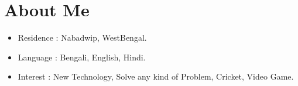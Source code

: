 \documentclass[letterpaper,11pt]{article}
\newcommand{\resumeItem}[1]{
  \item\small{
    {#1 \vspace{-2pt}}
  }
}
\newcommand{\resumeItemListStart}{\begin{itemize}}
\newcommand{\resumeItemListEnd}{\end{itemize}\vspace{-5pt}}
\begin{document}
 \section{About Me} 
    \resumeItemListStart
        \resumeItem {Residence : Nabadwip, WestBengal.} \\
        \resumeItem {Language : Bengali, English, Hindi.} \\
        \resumeItem {Interest : New Technology, Solve any kind of Problem, Cricket, Video Game.} \\
    \resumeItemListEnd
\sectionsep


%


\end{document}
